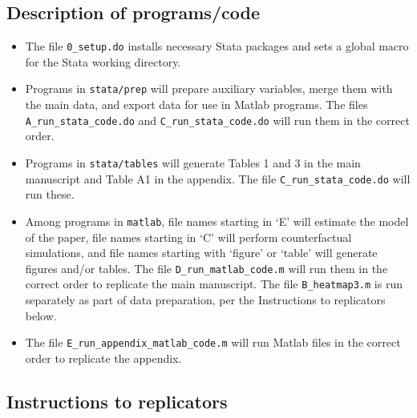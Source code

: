 \documentclass[12pt,english]{article}
\begin{document}
	\subsection*{Description of programs/code}
	\begin{itemize}
		\item The file \texttt{0\_setup.do} installs necessary Stata packages and
		sets a global macro for the Stata working directory.
		\item Programs in \texttt{stata/prep} will prepare auxiliary variables,
		merge them with the main data, and export data for use in Matlab programs.
		The files \texttt{A\_run\_stata\_code.do} and \texttt{C\_run\_stata\_code.do}
		will run them in the correct order.
		\item Programs in \texttt{stata/tables} will generate Tables 1 and 3 in the main manuscript and Table A1 in the appendix. The file \texttt{C\_run\_stata\_code.do} will run these.
		\item Among programs in \texttt{matlab}, file names starting in `E' will
		estimate the model of the paper, file names starting in `C' will perform
		counterfactual simulations, and file names starting with `figure'
		or `table' will generate figures and/or tables. The file \texttt{D\_run\_matlab\_code.m}
		will run them in the correct order to replicate the main manuscript. The file \texttt{B\_heatmap3.m}
		is run separately as part of data preparation, per the Instructions
		to replicators below.
		\item The file \texttt{E\_run\_appendix\_matlab\_code.m} will run Matlab files in the correct order to replicate the appendix.
	\end{itemize}
	
	\subsection*{Instructions to replicators}
	
\end{document}
